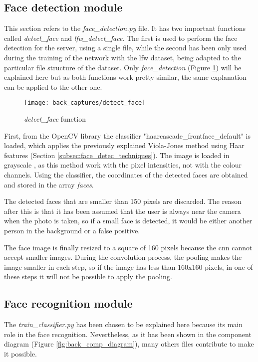 	\subsection{Face detection module}
	\label{subsec:face_det}
	This section refers to the \textit{face{\_}detection.py} file. It has two important functions called \textit{detect{\_}face} and \textit{lfw{\_}detect{\_}face}. The first is used to perform the face detection for the server, using a single file, while the second has been only used during the training of the network with the \gls{lfw} dataset, being adapted to the particular file structure of the dataset. Only \textit{face{\_}detection} (Figure \ref{fig:detect_face_function}) will be explained here but as both functions work pretty similar, the same explanation can be applied to the other one.

	\begin{figure}[!ht]
		\centering
		\texttt{[image: back\_captures/detect\_face]}
		\caption{\textit{detect{\_}face} function}
		\label{fig:detect_face_function}
	\end{figure}

	First, from the OpenCV library the classifier "haarcascade{\_}frontface{\_}default" is loaded, which applies the previously explained Viola-Jones method using Haar features (Section \ref{subsec:face_detec_techniques}). The image is loaded in grayscale , as this method work with the pixel intensities, not with the colour channels. Using the classifier, the coordinates of the detected faces are obtained and stored in the array \textit{faces}. 

	The detected faces that are smaller than 150 pixels are discarded. The reason after this is that it has been assumed that the user is always near the camera when the photo is taken, so if a small face is detected, it would be either another person in the background or a false positive.

	The face image is finally resized to a square of 160 pixels because the \gls{cnn} cannot accept smaller images. During the convolution process, the pooling makes the image smaller in each step, so if the image has less than 160x160 pixels, in one of these steps it will not be possible to apply the pooling.

	\subsection{Face recognition module}
	\label{subsec:face_recog}
	The \textit{train{\_}classifier.py} has been chosen to be explained here because its main role in the face recognition. Nevertheless, as it has been shown in the component diagram (Figure \ref{fig:back_comp_diagram}), many others files contribute to make it possible.

